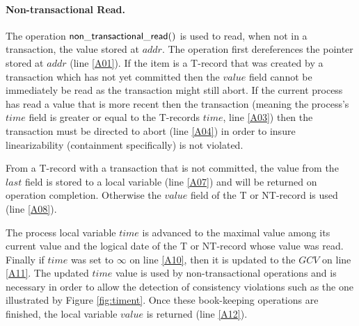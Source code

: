\documentclass[runningheads,a4paper]{llncs}
\begin{document}
\paragraph{Non-transactional Read.}
The   operation  ${\sf   non\_transactional\_read()}$  is   used   to  read,
when not in a transaction, the value stored at
$\mathit{addr}$.
The  operation first  dereferences  the pointer  stored at  $\mathit{addr}$
(line \ref{A01}).
If the item is a T-record that was created by a 
transaction which  has not yet  committed then the $\mathit{value}$ field
cannot be immediately be read as the transaction might still abort.
If the current process has read a value that is more recent then the transaction
(meaning the process's $\mathit{time}$ field is greater or equal to the T-records
$\mathit{time}$, line \ref{A03}) then the transaction must be directed to abort (line \ref{A04})
in order to insure linearizability (containment specifically) is not violated.

From a T-record with a transaction that is not committed, the value from the $\mathit{last}$
field is stored to a local variable (line \ref{A07}) and will be returned on operation completion.
Otherwise the $\mathit{value}$ field of the T or NT-record is used (line \ref{A08}).


The process local variable $\mathit{time}$ is advanced to 
the maximal 
value among its current 
value and the logical date of the T or NT-record whose value was read.
Finally if $\mathit{time}$ was set to $\infty$ on line \ref{A10}, then it is updated
to the $\mathit{GCV}$ on line \ref{A11}.
The updated  $\mathit{time}$
value is used by non-transactional operations and is necessary in order to allow 
the detection of consistency 
violations such as the one illustrated by Figure \ref{fig:timent}. 
Once these book-keeping 
operations are finished, the local variable $\mathit{value}$
is returned (line \ref{A12}).
\end{document}
